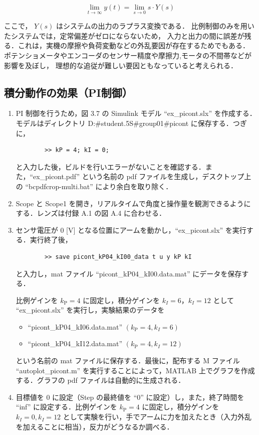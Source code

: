 \begin{equation}
  \lim_{t \to \infty} y(t) = \lim_{s \to 0} s \cdot Y(s)
\end{equation}

ここで， \( Y(s) \) はシステムの出力のラプラス変換である．
比例制御のみを用いたシステムでは，定常偏差がゼロにならないため，
入力と出力の間に誤差が残る．これは，実機の摩擦や負荷変動などの外乱要因が存在するためでもある．
ポテンショメータやエンコーダのセンサー精度や摩擦力,モータの不間帯などが影響を及ぼし，
理想的な追従が難しい要因ともなっていると考えられる．


\subsection{積分動作の効果（PI制御）}

\begin{enumerate}
  \item PI 制御を行うため，図 3.7 の Simulink モデル ``ex\_picont.slx'' を作成する．モデルはディレクトリ D:\#student.5S\#group01\#picont に保存する．つぎに，
        \begin{verbatim}
        >> kP = 4; kI = 0;
    \end{verbatim}
        と入力した後，ビルドを行いエラーがないことを確認する．また，``ex\_picont.pdf'' という名前の pdf ファイルを生成し，デスクトップ上の ``bcpdfcrop-multi.bat'' により余白を取り除く．
        
  \item Scope と Scope1 を開き，リアルタイムで角度と操作量を観測できるようにする．レンズは付録 A.1 の図 A.4 に合わせる．
        
  \item センサ電圧が 0 [V] となる位置にアームを動かし，``ex\_picont.slx'' を実行する．実行終了後，
        \begin{verbatim}
        >> save picont_kP04_kI00_data t u y kP kI
    \end{verbatim}
        と入力し，mat ファイル ``picont\_kP04\_kI00.data.mat'' にデータを保存する．
        
        比例ゲインを \( k_{\mathrm{P}} = 4 \) に固定し，積分ゲインを \( k_I = 6 \)，\( k_I = 12 \) として ``ex\_picont.slx'' を実行し，実験結果のデータを
        \begin{itemize}
          \item ``picont\_kP04\_kI06.data.mat'' \((k_{\mathrm{P}} = 4, k_I = 6)\)
          \item ``picont\_kP04\_kI12.data.mat'' \((k_{\mathrm{P}} = 4, k_I = 12)\)
        \end{itemize}
        という名前の mat ファイルに保存する．最後に，配布する M ファイル ``autoplot\_picont.m'' を実行することによって，MATLAB 上でグラフを作成する．グラフの pdf ファイルは自動的に生成される．
        
  \item 目標値を 0 に設定（Step の最終値を ``0'' に設定）し，また，終了時間を ``inf'' に設定する．比例ゲインを \( k_{\mathrm{P}} = 4 \) に固定し，積分ゲインを \( k_I = 0, k_I = 12 \) として実験を行い，手でアームに力を加えたとき（入力外乱を加えることに相当），反力がどうなるか調べる．
\end{enumerate}

